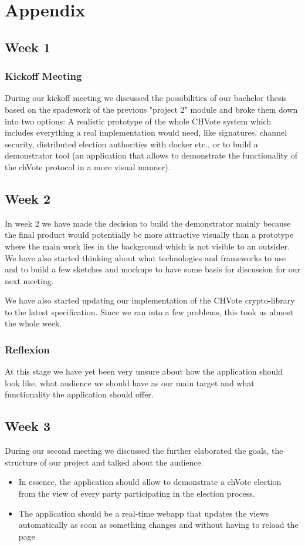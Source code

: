 \chapter{Appendix}

\section{Week 1}
\subsection{Kickoff Meeting}
During our kickoff meeting we discussed the possibilities of our bachelor thesis based on the spadework of the previous "project 2" module and broke them down into two options: A realistic prototype of the whole CHVote system which includes everything a real implementation would need, like signatures, channel security, distributed election authorities with docker etc., or to build a demonstrator tool (an application that allows to demonstrate the functionality of the chVote protocol in a more visual manner).

\section{Week 2}
In week 2 we have made the decision to build the demonstrator mainly because the final product would potentially be more attractive visually than a prototype where the main work lies in the background which is not visible to an outsider. We have also started thinking about what technologies and frameworks to use and to build a few sketches and mockups to have some basis for discussion for our next meeting.

We have also started updating our implementation of the CHVote crypto-library to the latest specification. Since we ran into a few problems, this took us almost the whole week.

\subsection{Reflexion}
At this stage we have yet been very unsure about how the application should look like, what audience we should have as our main target and what functionality the application should offer.

\section{Week 3}
During our second meeting we discussed the further elaborated the goals, the structure of our project and talked about the audience.
\begin{itemize}
\item In essence, the application should allow to demonstrate a chVote election from the view of every party participating in the election process.
\item The application should be a real-time webapp that updates the views automatically as soon as something changes and without having to reload the page
\end{itemize}

